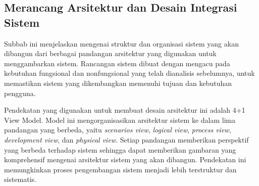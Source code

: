 \subsection{Merancang Arsitektur dan Desain Integrasi Sistem}
\label{subsec:merancang-aristektur-dan-desain-integrasi-sistem}

Subbab ini menjelaskan mengenai struktur dan organisasi sistem yang akan dibangun dari berbagai pandangan arsitektur yang digunakan untuk menggambarkan sistem. Rancangan sistem dibuat dengan mengacu pada kebutuhan fungsional dan nonfungsional yang telah 
dianalisis sebelumnya, untuk memastikan sistem yang dikembangkan memenuhi tujuan dan kebutuhan pengguna.

Pendekatan yang digunakan untuk membuat desain arsitektur ini adalah 4+1 View Model. Model ini mengorganisasikan arsitektur sistem ke dalam lima pandangan yang berbeda, yaitu \emph{scenarios view}, \emph{logical view}, \emph{process view}, \emph{development view}, dan \emph{physical view}. Setiap pandangan memberikan perspektif yang berbeda terhadap sistem sehingga dapat memberikan gambaran yang komprehensif mengenai arsitektur sistem yang akan dibangun. Pendekatan ini memungkinkan proses pengembangan sistem menjadi lebih terstruktur dan sistematis.









